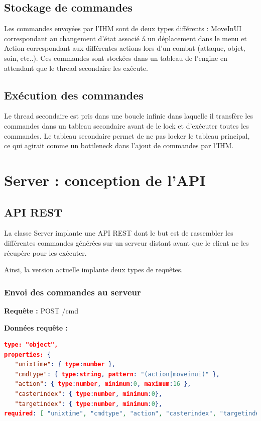 \documentclass[12pt,a4paper]{report}
\begin{document}
\section{Stockage de commandes}

Les commandes envoy\'{e}es par l'IHM sont de deux types diff\'{e}rents : MoveInUI correspondant au changement d'\'{e}tat associ\'{e} \'{a} un d\'{e}placement dans le menu et Action correspondant aux diff\'{e}rentes actions lors d'un combat (attaque, objet, soin, etc..). Ces commandes sont stock\'{e}es dans un tableau de l'engine en attendant que le thread secondaire les ex\'{e}cute.

\section{Ex\'{e}cution des commandes}

Le thread secondaire est pris dans une boucle infinie dans laquelle il transf\`{e}re les commandes dans un tableau secondaire avant de le lock et d'ex\'{e}cuter toutes les commandes. Le tableau secondaire permet de ne pas locker le tableau principal, ce qui agirait comme un bottleneck dans l'ajout de commandes par l'IHM.

\chapter{Server : conception de l'API}

\section{API REST}
La classe Server implante une API REST dont le but est de rassembler les diff\'{e}rentes commandes g\'{e}n\'{e}r\'{e}es sur un serveur distant avant que le client ne les r\'{e}cup\`{e}re pour les ex\'{e}cuter.

Ainsi, la version actuelle implante deux types de requêtes.

\subsection{Envoi des commandes au serveur}

\textbf{Requête :} POST /cmd

\textbf{Données requête :} 

\begin{lstlisting}[language=JSON]
type: "object",
properties: {
   "unixtime": { type:number },
   "cmdtype": { type:string, pattern: "(action|moveinui)" },
   "action": { type:number, minimum:0, maximum:16 },
   "casterindex": { type:number, minimum:0},
   "targetindex": { type:number, minimum:0},
required: [ "unixtime", "cmdtype", "action", "casterindex", "targetindex" ]
\end{lstlisting}
\end{document}
